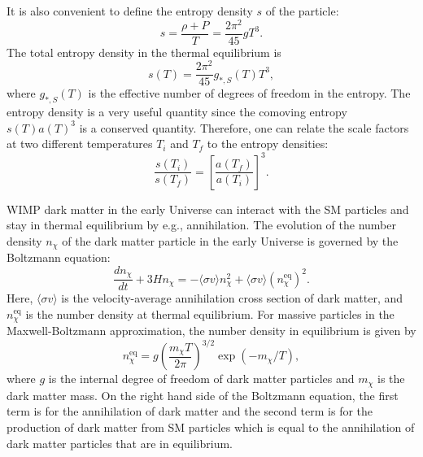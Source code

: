 \documentclass[doublespace,nopageskip]{VTthesis}
\begin{document}
It is also convenient to define the entropy density $s$ of the particle:
\begin{equation}
    s = \frac{\rho + P}{T} = \frac{2\pi^2}{45}gT^3.
\end{equation}
The total entropy density in the thermal equilibrium is
\begin{equation}
    s(T) = \frac{2\pi^2}{45}g_{*,S}(T)T^3,
\end{equation}
where $g_{*,S}(T)$ is the effective number of degrees of freedom in the entropy. The entropy density is a very useful quantity since the comoving entropy $s(T)a(T)^3$ is a conserved quantity. Therefore, one can relate the scale factors at two different temperatures $T_i$ and $T_f$ to the entropy densities:
\begin{equation}
    \frac{s(T_i)}{s(T_f)} = \left[\frac{a(T_f)}{a(T_i)}\right]^3.
\end{equation}

WIMP dark matter in the early Universe can interact with the SM particles and stay in thermal equilibrium by e.g., annihilation. The evolution of the number density $n_\chi$ of the dark matter particle in the early Universe is governed by the Boltzmann equation:
\begin{equation}
    \frac{dn_\chi}{dt} + 3Hn_\chi = - \langle\sigma v\rangle n_\chi^2 + \langle\sigma v\rangle(n_\chi^{\mathrm{eq}})^2.
\end{equation}
Here, $\langle\sigma v\rangle$ is the velocity-average annihilation cross section of dark matter, and
$n_\chi^{\mathrm{eq}}$ is the number density at thermal equilibrium. For massive particles in the Maxwell-Boltzmann approximation, the number density in equilibrium is given by
\begin{equation}
    n_\chi^{\mathrm{eq}} = g\left( \frac{m_\chi T}{2\pi} \right)^{3/2}\exp(-m_\chi/T),
\end{equation}
where $g$ is the internal degree of freedom of dark matter particles and $m_\chi$ is the dark matter mass. On the right hand side of the Boltzmann equation, the first term is for the annihilation of dark matter and the second term is for the production of dark matter from SM particles which is equal to the annihilation of dark matter particles that are in equilibrium.
\end{document}
